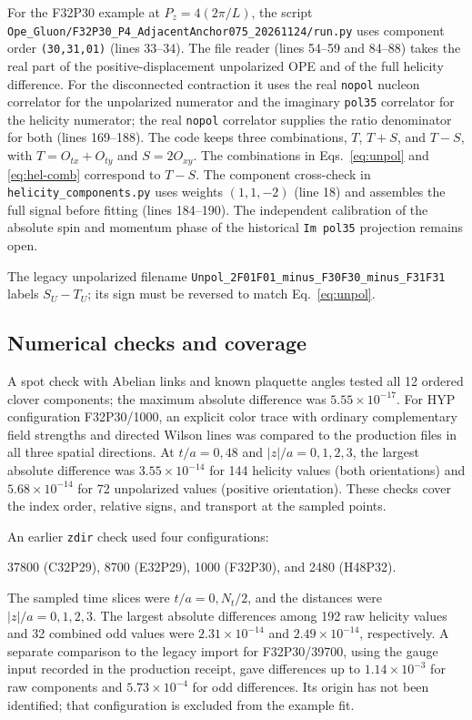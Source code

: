 \documentclass[11pt,a4paper]{article}
\begin{document}
For the F32P30 example at \(P_z=4(2\pi/L)\), the script
\nolinkurl{Ope_Gluon/F32P30_P4_AdjacentAnchor075_20261124/run.py}
uses component order \texttt{(30,31,01)} (lines 33--34). The file reader
(lines 54--59 and 84--88) takes the real part of the positive-displacement
unpolarized OPE and of the full helicity difference. For the disconnected
contraction it uses the real \texttt{nopol} nucleon correlator for the
unpolarized numerator and the imaginary \texttt{pol35} correlator for
the helicity numerator; the real \texttt{nopol} correlator supplies the
ratio denominator for both (lines 169--188). The code keeps three
combinations, \(T\), \(T+S\), and \(T-S\), with \(T=O_{tx}+O_{ty}\) and
\(S=2O_{xy}\). The combinations in Eqs.~\eqref{eq:unpol} and
\eqref{eq:hel-comb} correspond to \(T-S\). The component cross-check in
\nolinkurl{helicity_components.py} uses weights \((1,1,-2)\) (line 18) and
assembles the full signal before fitting (lines 184--190).
The independent calibration of the absolute spin and momentum phase
of the historical \texttt{Im pol35} projection remains open.

The legacy unpolarized filename
\nolinkurl{Unpol_2F01F01_minus_F30F30_minus_F31F31} labels \(S_U-T_U\);
its sign must be reversed to match Eq.~\eqref{eq:unpol}.

\subsection{Numerical checks and coverage}
A spot check with Abelian links and known plaquette angles tested all 12
ordered clover components; the maximum absolute difference was
\(5.55\times10^{-17}\). For HYP configuration F32P30/1000, an explicit
color trace with ordinary complementary field strengths and directed
Wilson lines was compared to the production files in all three spatial
directions. At \(t/a=0,48\) and \(|z|/a=0,1,2,3\), the largest absolute
difference was \(3.55\times10^{-14}\) for 144 helicity values (both
orientations) and \(5.68\times10^{-14}\) for 72 unpolarized values (positive
orientation). These checks cover the index order, relative signs, and
transport at the sampled points.

An earlier \texttt{zdir} check used four configurations:
\begin{center}
37800 (C32P29), 8700 (E32P29), 1000 (F32P30), and 2480 (H48P32).
\end{center}
The sampled time slices were \(t/a=0,N_t/2\), and the distances were
\(|z|/a=0,1,2,3\).
The largest absolute differences among 192 raw helicity values and 32
combined odd values were \(2.31\times10^{-14}\) and
\(2.49\times10^{-14}\), respectively. A separate comparison to the
legacy import for F32P30/39700, using the gauge input recorded in the
production receipt, gave differences up to \(1.14\times10^{-3}\) for raw
components and \(5.73\times10^{-4}\) for odd differences. Its origin has
not been identified; that configuration is excluded from the example fit.
\end{document}
